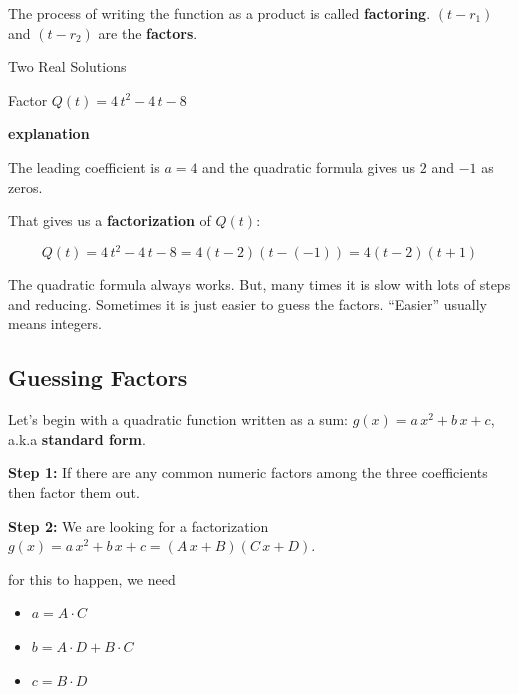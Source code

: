 \documentclass{ximera}
\begin{document}
The process of writing the function as a product is called \textbf{factoring}. $(t - r_1)$  and $(t - r_2)$ are the \textbf{factors}.



\begin{example} Two Real Solutions

Factor $Q(t) = 4 \, t^2 - 4 \, t - 8$ 


\textbf{\textcolor{red!75!green}{explanation}} 


The leading coefficient is $a=4$ and the quadratic formula gives us $2$ and $-1$ as zeros.  

That gives us a \textbf{factorization} of $Q(t)$:



\[    Q(t) = 4 \, t^2 - 4 \, t - 8 =  4 (t-2)(t-(-1))    = 4 (t-2)(t+1)         \]



\end{example}



The quadratic formula always works.  But, many times it is slow with lots of steps and reducing.  Sometimes it is just easier to guess the factors.  ``Easier'' usually means integers.




















\subsection*{Guessing Factors}


Let's begin with a quadratic function written as a sum: $g(x) = a \, x^2 + b \, x + c$, a.k.a \textbf{standard form}.  


\textbf{\textcolor{blue!75!black}{Step 1:}} If there are any common numeric factors among the three coefficients then factor them out.


\textbf{\textcolor{blue!75!black}{Step 2:}} We are looking for a factorization $g(x) = a \, x^2 + b \, x + c = (A \, x + B)(C \, x + D)$.

for this to happen, we need

\begin{itemize}
\item $a = A \cdot C $
\item $b = A\cdot D + B \cdot C$
\item $c = B \cdot D$
\end{itemize}
\end{document}
